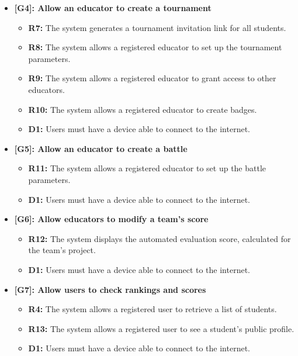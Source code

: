 \documentclass[12pt,oneside,a4paper]{article}
\begin{document}
\begin{itemize}
\begin{itemize}
        \item \textbf{D2:} Users give consent to the platform to receive notifications. 
    \end{itemize}$\\$
    \item \textbf{[G4]: Allow an educator to create a tournament}
    \begin{itemize}
        \item \textbf{R7:} The system generates a tournament invitation link for all students. 
        \item \textbf{R8:} The system allows a registered educator to set up the tournament parameters.
        \item \textbf{R9:} The system allows a registered educator to grant access to other educators.
        \item \textbf{R10:} The system allows a registered educator to create badges.
        \item \textbf{D1:} Users must have a device able to connect to the internet.
    \end{itemize}
    \item \textbf{[G5]: Allow an educator to create a battle}
    \begin{itemize}
        \item \textbf{R11:} The system allows a registered educator to set up the battle parameters.
        \item \textbf{D1:} Users must have a device able to connect to the internet.
    \end{itemize}
    \item \textbf{[G6]: Allow educators to modify a team's score}
    \begin{itemize}
        \item \textbf{R12:} The system displays the automated evaluation score, calculated for the team's project.
        \item \textbf{D1:} Users must have a device able to connect to the internet.
    \end{itemize}
    \item \textbf{[G7]: Allow users to check rankings and scores}
    \begin{itemize}
        \item \textbf{R4:} The system allows a registered user to retrieve a list of students.
        \item \textbf{R13:} The system allows a registered user to see a student's public profile.
        \item \textbf{D1:} Users must have a device able to connect to the internet.
    \end{itemize}
\end{itemize}
\end{document}
